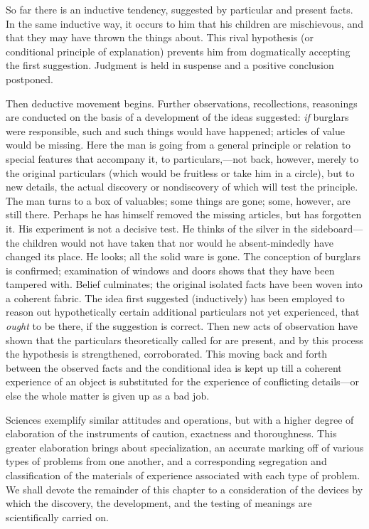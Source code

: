 \documentclass[showtrims,ustradepaper]{memoir}
\begin{document}

So far there is an inductive tendency, suggested by particular and
present facts. In the same inductive way, it occurs to him that his
children are mischievous, and that they may have thrown the things
about. This rival hypothesis (or conditional principle of explanation)
prevents him from dogmatically accepting the first suggestion. Judgment
is held in suspense and a positive conclusion
postponed.


Then deductive movement begins. Further observations, recollections,
reasonings are conducted on the basis of a development of the ideas
suggested: \emph{if} burglars were responsible, such and such things
would have happened; articles of value would be missing. Here the man is
going from a general principle or relation to special features that
accompany it, to particulars,---not back, however, merely to the
original particulars (which would be fruitless or take him in a circle),
but to new details, the actual discovery or nondiscovery of which will
test the principle. The man turns to a box of valuables; some things are
gone; some, however, are still there. Perhaps he has himself removed the
missing articles, but has forgotten it. His experiment is not a decisive
test. He thinks of the silver in the sideboard---the children would not
have taken that nor would he absent-mindedly have changed its place. He
looks; all the solid ware is gone. The conception of burglars is
confirmed; examination of windows and doors shows that they have been
tampered with. Belief culminates; the original isolated facts have been
woven into a coherent fabric. The idea first suggested (inductively) has
been employed to reason out hypothetically certain additional
particulars not yet experienced, that \emph{ought} to be there, if the
suggestion is correct. Then new acts of observation have shown that the
particulars theoretically called for are present, and by this process
the hypothesis is strengthened, corroborated. This moving back and forth
between the observed facts and the conditional idea is kept up till a
coherent experience of an object is substituted for the experience of
conflicting details---or else the whole matter is given up as a bad job.


Sciences exemplify similar attitudes and
operations,
but with a higher degree of elaboration of the instruments of caution,
exactness and thoroughness. This greater elaboration brings about
specialization, an accurate marking off of various types of problems
from one another, and a corresponding segregation and classification of
the materials of experience associated with each type of problem. We
shall devote the remainder of this chapter to a consideration of the
devices by which the discovery, the development, and the testing of
meanings are scientifically carried on.
\end{document}
